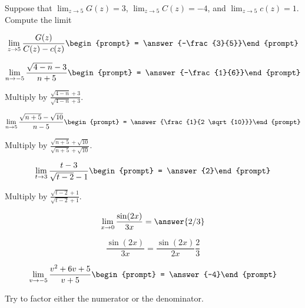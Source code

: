 \documentclass[handout]{ximera}
\begin{document}
\begin{exercise}
Suppose that $\lim_{z\to5}G(z)=3$, $\lim_{z\to5}C(z)=-4$, and $\lim_{z\to5}c(z)=1$. Compute the limit

\[
\lim_{z\to 5 } \frac{G(z)}{C(z)-c(z)}\begin{prompt} = \answer{-\frac{3}{5}}\end{prompt}
\]
\end{exercise}

\begin{exercise}
\[
\lim_{n\to -5 } \frac{\sqrt{4-n}-3}{n+5}\begin{prompt} = \answer{-\frac{1}{6}}\end{prompt}
\]
\begin{hint}
Multiply by $\frac{\sqrt{4-n}+3}{\sqrt{4-n}+3}$.
\end{hint}
\end{exercise}

\begin{exercise}
\[
\lim_{n\to 5 } \frac{\sqrt{n+5}-\sqrt{10}}{n-5}\begin{prompt} = \answer{\frac{1}{2 \sqrt{10}}}\end{prompt}
\]
\begin{hint}
Multiply by $\frac{\sqrt{n+5}+\sqrt{10}}{\sqrt{n+5}+\sqrt{10}}$.
\end{hint}
\end{exercise}


\begin{exercise}
\[
\lim_{t\to 3 } \frac{t-3}{\sqrt{t-2}-1}\begin{prompt} = \answer{2}\end{prompt}
\]
\begin{hint}
Multiply by $\frac{\sqrt{t-2}+1}{\sqrt{t-2}+1}$.
\end{hint}
\end{exercise}

\begin{exercise}
\[\lim_{x \to 0} \frac{\sin(2x)}{3x} = \answer{2/3}\]

\begin{hint}
	\[\frac{\sin(2x)}{3x} = \frac{\sin(2x)}{2x} \frac{2}{3}\]
\end{hint}


\end{exercise}

\begin{exercise}
\[
\lim_{v\to -5 } \frac{v^2+6 v+5}{v+5}\begin{prompt} = \answer{-4}\end{prompt}
\]
\begin{hint}
Try to factor either the numerator or the denominator.
\end{hint}
\end{exercise}
\end{document}
